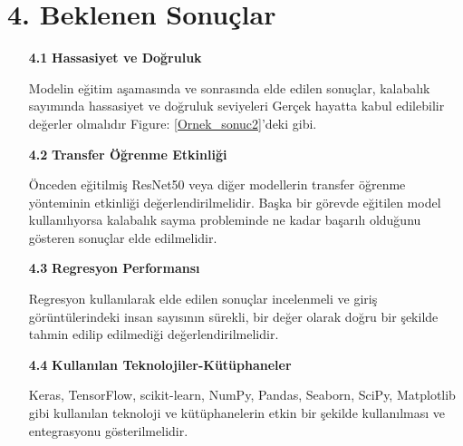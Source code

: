 \documentclass[10pt,a4paper]{report}
\begin{document}
		
\raggedright	\section*{4. Beklenen Sonuçlar}
			
			
	\begin{enumerate}
			\item[\textbf{4.1}] \textbf{Hassasiyet ve Doğruluk}	
			
				
					Modelin eğitim aşamasında ve sonrasında elde edilen sonuçlar, kalabalık sayımında  hassasiyet ve doğruluk seviyeleri Gerçek hayatta kabul edilebilir değerler olmalıdır Figure: \ref{Ornek_sonuc2}'deki gibi.\\
					
			\item[\textbf{4.2}] \textbf{Transfer Öğrenme Etkinliği}		
				
			  	   Önceden eğitilmiş ResNet50 veya diğer modellerin transfer öğrenme yönteminin etkinliği değerlendirilmelidir. Başka bir görevde eğitilen model kullanılıyorsa kalabalık sayma probleminde ne kadar başarılı olduğunu gösteren sonuçlar elde edilmelidir.
					
					
					
			\item[\textbf{4.3}] \textbf{Regresyon Performansı}	
					
					Regresyon kullanılarak elde edilen sonuçlar incelenmeli ve giriş görüntülerindeki insan sayısının sürekli, bir değer olarak doğru bir şekilde tahmin edilip edilmediği değerlendirilmelidir.		

			\item[\textbf{4.4}] \textbf{Kullanılan Teknolojiler-Kütüphaneler}
			
			
				   Keras, TensorFlow, scikit-learn, NumPy, Pandas, Seaborn, SciPy, Matplotlib gibi kullanılan teknoloji ve kütüphanelerin etkin bir şekilde kullanılması ve entegrasyonu gösterilmelidir.			
					
				
					
					
	\end{enumerate}




	
	 
\end{document}
